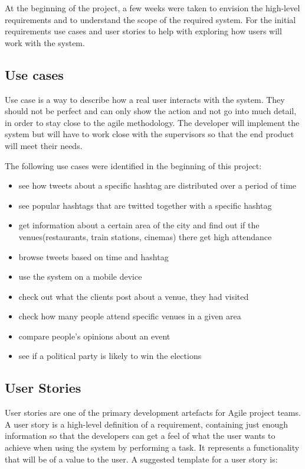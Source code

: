 \documentclass{l4proj}
\begin{document}
At the beginning of the project, a few weeks were taken to envision the high-level requirements and to understand the scope of the required system. For the initial requirements use cases and user stories to help with exploring how users will work with the system. 

\subsection{Use cases} 

Use case is a way to describe how a real user interacts with the system. They should not be perfect and can only show the action and not go into much detail, in order to stay close to the agile methodology. The developer will implement the system but will have to work close with the supervisors so that the end product will meet their needs. 

The following use cases were identified in the beginning of this project: 


\begin{itemize}%
	\item see how tweets about a specific hashtag are distributed over a period of time
	\item see popular hashtags that are twitted together with a specific hashtag
	\item get information about a certain area of the city and find out if the venues(restaurants, train stations, cinemas) there get high attendance
	\item browse tweets based on time and hashtag
	\item use the system on a mobile device
	\item check out what the clients post about a venue, they had visited
	\item check how many people attend specific venues in a given area
	\item compare people's opinions about an event
	\item see if a political party is likely to win the elections
\end{itemize}


\subsection{User Stories}

User stories are one of the primary development artefacts for Agile project teams. A user story is a high-level definition of a requirement, containing just enough information so that the developers can get a feel of what the user wants to achieve when using the system by performing a task. It represents a functionality that will be of a value to the user. A suggested template for a user story is: 
\end{document}
